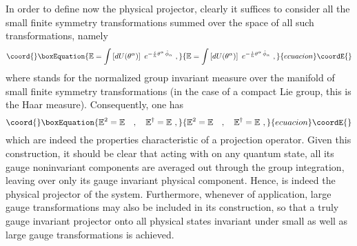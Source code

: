 \documentclass[a4paper,11pt]{article}
\def\proj{\mathbb E}
\begin{document}
In order to define now the physical projector, clearly it suffices to
consider all the small finite symmetry transformations \coordHE{}
summed over the space of all such transformations, namely
\begin{equation}\coord{}\boxEquation{
\proj=\int\left[dU(\theta^\alpha)\right]\ 
e^{-\frac{i}{\hbar}\theta^\alpha\,\hat{\phi}_\alpha}\ ,
}{
\proj=\int\left[dU(\theta^\alpha)\right]\ 
e^{-\frac{i}{\hbar}\theta^\alpha\,\hat{\phi}_\alpha}\ ,
}{ecuacion}\coordE{}\end{equation}
where \myHighlight{$[dU(\theta^\alpha)]$}\coordHE{} stands for the normalized group invariant measure
over the manifold of small finite symmetry transformations (in the case
of a compact Lie group, this is the Haar measure). Consequently, one has
\begin{equation}\coord{}\boxEquation{
\proj^2=\proj\ \ \ ,\ \ \ \proj^\dagger=\proj\ ,
}{
\proj^2=\proj\ \ \ ,\ \ \ \proj^\dagger=\proj\ ,
}{ecuacion}\coordE{}\end{equation}
which are indeed the properties characteristic of a projection operator.
Given this construction, it should be clear that acting with \myHighlight{$\proj$}\coordHE{} on
any quantum state, all its gauge noninvariant components are averaged
out through the group integration, leaving over only its gauge invariant
physical component. Hence, \myHighlight{$\proj$}\coordHE{} is indeed the physical projector
of the system.\cite{Klaud1} Furthermore, whenever of application, large
gauge transformations may also be included in its construction, so that
a truly gauge invariant projector onto all physical states invariant
under small as well as large gauge transformations is achieved.
\end{document}
